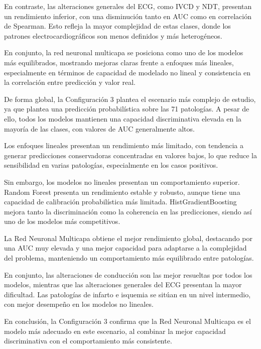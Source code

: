 \documentclass[12pt,a4paper,twoside]{book}
\begin{document}
En contraste, las alteraciones generales del ECG, como IVCD y NDT, presentan un rendimiento inferior, con una disminución tanto en AUC como en correlación de Spearman. 
Esto refleja la mayor complejidad de estas clases, donde los patrones electrocardiográficos son menos definidos y más heterogéneos.

En conjunto, la red neuronal multicapa se posiciona como uno de los modelos más equilibrados, mostrando mejoras claras frente a enfoques más lineales, especialmente en términos de capacidad de modelado no lineal y consistencia en la correlación entre predicción y valor real.

\vspace{1cm}

De forma global, la Configuración 3 plantea el escenario más complejo de estudio, ya que plantea una predicción probabilística sobre las 71 patologías.
A pesar de ello, todos los modelos mantienen una capacidad discriminativa elevada en la mayoría de las clases, con valores de AUC generalmente altos.

Los enfoques lineales presentan un rendimiento más limitado, con tendencia a generar predicciones conservadoras concentradas en valores bajos, lo que reduce la sensibilidad en varias patologías, especialmente en los casos positivos.

Sin embargo, los modelos no lineales presentan un comportamiento superior. 
Random Forest presenta un rendimiento estable y robusto, aunque tiene una capacidad de calibración probabilística más limitada.
HistGradientBoosting mejora tanto la discriminación como la coherencia en las predicciones, siendo así uno de los modelos más competitivos.

La Red Neuronal Multicapa obtiene el mejor rendimiento global, destacando por una AUC muy elevada y una mejor capacidad para adaptarse a la complejidad del problema, manteniendo un comportamiento más equilibrado entre patologías.

En conjunto, las alteraciones de conducción son las mejor resueltas por todos los modelos, mientras que las alteraciones generales del ECG presentan la mayor dificultad. 
Las patologías de infarto e isquemia se sitúan en un nivel intermedio, con mejor desempeño en los modelos no lineales.

En conclusión, la Configuración 3 confirma que la Red Neuronal Multicapa es el modelo más adecuado en este escenario, al combinar la mejor capacidad discriminativa con el comportamiento más consistente.
\end{document}
